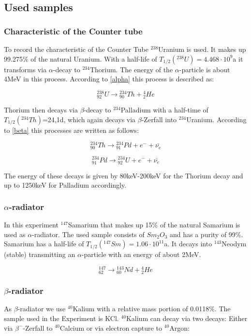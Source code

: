 \documentclass[12pt]{article}
\begin{document}
\subsection{Used samples}

\subsubsection{Characteristic of the Counter tube}\label{uranium}
To record the characteristic of the Counter Tube ${}^{238}$Uranium is used. It makes up 99.275\% of the natural Uranium.
With a half-life of $T_{1/2}({}^{238}U)=4.468\cdot 10^9$a it transforms via  $\alpha$-decay to ${}^{234}$Thorium. The energy of the $\alpha$-particle is about 4MeV in this process. According to \ref{alpha} this process is described as:

\[{}^{238}_{92}U \rightarrow {}^{234}_{90}Th + {}^4_2He\]

Thorium then decays via $\beta$-decay  to ${}^{234}$Palladium with a half-time of  $T_{1/2}({}^{234}Th)$=24,1d, which again decays via  $\beta$-Zerfall into ${}^{234}$Uranium. According to \ref{beta} this processes are written as follows:

\[{}^{234}_{90}Th \rightarrow {}^{234}_{91}Pd + e^- + \bar{\nu_e}\]

\[{}^{234}_{91}Pd \rightarrow {}^{234}_{92}U + e^- + \bar{\nu_e}\]

The energy of these decays is given by 80keV-200keV for the Thorium decay and up to 1250keV for Palladium accordingly.


\subsubsection{$\alpha$-radiator}

In this experiment ${}^{147}$Samarium that makes up 15\% of the natural Samarium is used as $\alpha$-radiator. The used sample consists of $Sm_2O_3$ and has a purity of 99\%. Samarium has a half-life of  $T_{1/2}({}^{147}Sm)=1.06\cdot10^{11}$a. It decays into ${}^{143}$Neodym (stable) transmitting an $\alpha$-particle with an energy of about 2MeV.

\[{}^{147}_{62} \rightarrow {}^{143}_{60}Nd + {}^4_2He\]

\subsubsection{$\beta$-radiator}\label{kaliumdurchfuehrung}
As $\beta$-radiator we use ${}^{40}$Kalium with a relative  mass portion of 0.0118\%. The sample used in the Experiment is KCl. 
${}^{40}$Kalium can decay via two decays: Either via $\beta^-$-Zerfall to ${}^{40}$Calcium or via electron capture to ${}^{40}$Argon:
\end{document}
